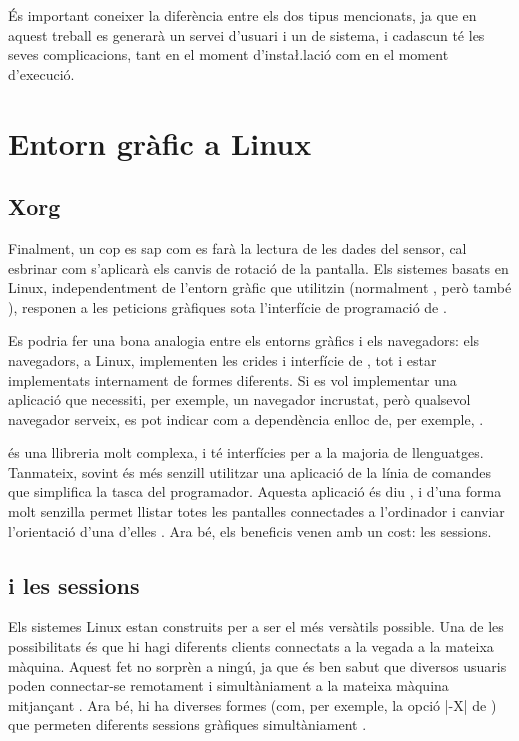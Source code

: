 És important coneixer la diferència entre els dos tipus mencionats, ja que en
aquest treball es generarà un servei d'usuari i un de sistema, i cadascun té
les seves complicacions, tant en el moment d'insta\l.lació com en el moment
d'execució.

\section{Entorn gràfic a Linux}



\subsection{Xorg}

Finalment, un cop es sap com es farà la lectura de les dades del sensor, cal
esbrinar com s'aplicarà els canvis de rotació de la pantalla. Els sistemes
basats en Linux, independentment de l'entorn gràfic que utilitzin (normalment
, però també ), responen a les peticions gràfiques sota
l'interfície de programació de  \cite{Xlib}.

Es podria fer una bona analogia entre
els entorns gràfics i els navegadors: els navegadors, a Linux, implementen les
crides i interfície de , tot i estar implementats internament
de formes diferents. Si es vol implementar una aplicació que necessiti, per
exemple, un navegador incrustat, però qualsevol navegador serveix, es pot
indicar com a dependència  enlloc de, per exemple, .

 és una llibreria molt complexa, i té interfícies per a la majoria
de llenguatges. Tanmateix, sovint és més senzill utilitzar una aplicació de
la línia de comandes que simplifica la tasca del programador. Aquesta
aplicació és diu , i d'una forma molt senzilla permet llistar
totes les pantalles connectades a l'ordinador i canviar l'orientació
d'una d'elles \cite{Xrandr}. Ara bé, els beneficis venen amb un cost: les sessions.

\subsection{ i les sessions}
\label{subsec:xrandr}

Els sistemes Linux estan construits per a ser el més versàtils possible. Una
de les possibilitats és que hi hagi diferents clients connectats a la vegada
a la mateixa màquina. Aquest fet no sorprèn a ningú, ja que és ben sabut que
diversos usuaris poden connectar-se remotament i simultàniament a la mateixa
màquina mitjançant . Ara bé, hi ha diverses formes (com, per exemple,
la opció \ord|-X| de ) que permeten diferents sessions gràfiques
simultàniament \cite{ManSSH}.

